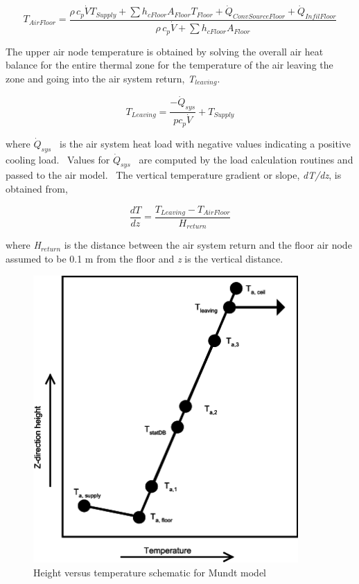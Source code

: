 \begin{equation}
{T_{AirFloor}} = \frac{{\rho \,{c_p}\dot V{T_{Supply}} + \sum {{h_{cFloor}}{A_{Floor}}{T_{Floor}}}  + {{\dot Q}_{ConvSourceFloor}} + {{\dot Q}_{InfilFloor}}}}{{\rho \,{c_p}\dot V + \sum {{h_{cFloor}}{A_{Floor}}} }}
\end{equation}

The upper air node temperature is obtained by solving the overall air heat balance for the entire thermal zone for the temperature of the air leaving the zone and going into the air system return, \emph{T\(_{leaving}\)}.

\begin{equation}
{T_{Leaving}} = \frac{{ - {{\dot Q}_{sys}}}}{{p{c_p}\dot V}} + {T_{Supply}}
\end{equation}

where \({\dot Q_{sys}}\) ~is the air system heat load with negative values indicating a positive cooling load.~ Values for \({\dot Q_{sys}}\) ~are computed by the load calculation routines and passed to the air model.~ The vertical temperature gradient or slope, \emph{dT/dz}, is obtained from,

\begin{equation}
\frac{{dT}}{{dz}} = \frac{{{T_{Leaving}} - {T_{AirFloor}}}}{{{H_{return}}}}
\end{equation}

where \emph{H\(_{return}\)} is the distance between the air system return and the floor air node assumed to be 0.1 m from the floor and \emph{z} is the vertical distance.

\begin{figure}[hbtp] %
\centering
\includegraphics[width=0.9\textwidth, height=0.9\textheight, keepaspectratio=true]{media/image2341.svg.png}
\caption{Height versus temperature schematic for Mundt model \protect \label{fig:height-versus-temperature-schematic-for-mundt}}
\end{figure}

